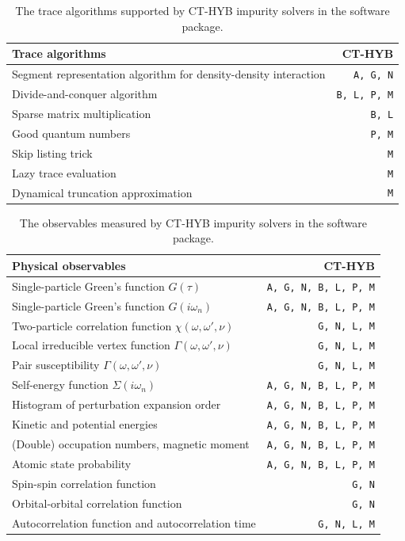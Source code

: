 \begin{table}[htbp]
\centering
\caption[The trace algorithms supported by CT-HYB impurity solvers in the {\iqist} software package]{The trace algorithms supported by CT-HYB impurity solvers in the {\iqist} software package. \label{tab:feature_fast}}
\begin{tabular}{lr}
\hline
\hline
Trace algorithms & CT-HYB \\
\hline
Segment representation algorithm for density-density interaction & \texttt{A, G, N} \\
Divide-and-conquer algorithm & \texttt{B, L, P, M} \\
Sparse matrix multiplication & \texttt{B, L} \\
Good quantum numbers & \texttt{P, M} \\
Skip listing trick & \texttt{M} \\
Lazy trace evaluation & \texttt{M} \\
Dynamical truncation approximation & \texttt{M} \\
\hline
\hline
\end{tabular}
\end{table}

\begin{table}[htbp]
\centering
\caption[The observables measured by CT-HYB impurity solvers in the {\iqist} software package]{The observables measured by CT-HYB impurity solvers in the {\iqist} software package. \label{tab:feature_observables}}
\begin{tabular}{lr}
\hline
\hline
Physical observables & CT-HYB \\
\hline
Single-particle Green's function $G(\tau)$ & \texttt{A, G, N, B, L, P, M} \\
Single-particle Green's function $G(i\omega_n)$ & \texttt{A, G, N, B, L, P, M} \\
Two-particle correlation function $\chi(\omega, \omega', \nu)$ & \texttt{G, N, L, M} \\
Local irreducible vertex function $\Gamma(\omega, \omega', \nu)$ & \texttt{G, N, L, M} \\
Pair susceptibility $\Gamma(\omega, \omega', \nu)$ & \texttt{G, N, L, M} \\
Self-energy function $\Sigma(i\omega_n)$ & \texttt{A, G, N, B, L, P, M} \\
Histogram of perturbation expansion order & \texttt{A, G, N, B, L, P, M} \\
Kinetic and potential energies & \texttt{A, G, N, B, L, P, M} \\
(Double) occupation numbers, magnetic moment & \texttt{A, G, N, B, L, P, M} \\
Atomic state probability & \texttt{A, G, N, B, L, P, M} \\
Spin-spin correlation function & \texttt{G, N} \\
Orbital-orbital correlation function & \texttt{G, N} \\
Autocorrelation function and autocorrelation time & \texttt{G, N, L, M} \\
\hline\hline
\end{tabular}
\end{table}

